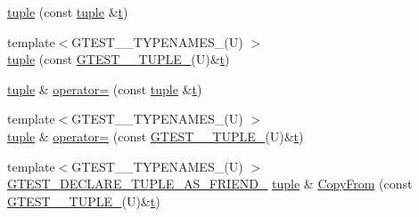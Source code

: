 \begin{DoxyCompactItemize}
\item 
\mbox{\hyperlink{classstd_1_1tr1_1_1tuple_ade1807f6e6b36daa6387c3b00dbd3be6}{tuple}} (const \mbox{\hyperlink{classstd_1_1tr1_1_1tuple}{tuple}} \&\mbox{\hyperlink{_mutual_8h_a978d88b393c8a37dc2614c88788b3442}{t}})
\item 
{\footnotesize template$<$G\+T\+E\+S\+T\+\_\+\_\+\+T\+Y\+P\+E\+N\+A\+M\+E\+S\+\_\+(\+U) $>$ }\\\mbox{\hyperlink{classstd_1_1tr1_1_1tuple_a7ff289d5c5a605e4a4f8fb56913f7370}{tuple}} (const \mbox{\hyperlink{namespacestd_1_1tr1_aa636d3269bf1f368a7bc09ff158bc482}{G\+T\+E\+S\+T\+\_\+\_\+\+T\+U\+P\+L\+E\+\_\+}}(U)\&\mbox{\hyperlink{_mutual_8h_a978d88b393c8a37dc2614c88788b3442}{t}})
\item 
\mbox{\hyperlink{classstd_1_1tr1_1_1tuple}{tuple}} \& \mbox{\hyperlink{classstd_1_1tr1_1_1tuple_ae52bd211e87c30ea7243246fa06bf038}{operator=}} (const \mbox{\hyperlink{classstd_1_1tr1_1_1tuple}{tuple}} \&\mbox{\hyperlink{_mutual_8h_a978d88b393c8a37dc2614c88788b3442}{t}})
\item 
{\footnotesize template$<$G\+T\+E\+S\+T\+\_\+\_\+\+T\+Y\+P\+E\+N\+A\+M\+E\+S\+\_\+(\+U) $>$ }\\\mbox{\hyperlink{classstd_1_1tr1_1_1tuple}{tuple}} \& \mbox{\hyperlink{classstd_1_1tr1_1_1tuple_a9ed59ab84e2ff750d0a188c3d9dac819}{operator=}} (const \mbox{\hyperlink{namespacestd_1_1tr1_aa636d3269bf1f368a7bc09ff158bc482}{G\+T\+E\+S\+T\+\_\+\_\+\+T\+U\+P\+L\+E\+\_\+}}(U)\&\mbox{\hyperlink{_mutual_8h_a978d88b393c8a37dc2614c88788b3442}{t}})
\item 
{\footnotesize template$<$G\+T\+E\+S\+T\+\_\+\_\+\+T\+Y\+P\+E\+N\+A\+M\+E\+S\+\_\+(\+U) $>$ }\\\mbox{\hyperlink{gtest-tuple_8h_a2b20671273f514a88a6e9b8328e5f257}{G\+T\+E\+S\+T\+\_\+\+D\+E\+C\+L\+A\+R\+E\+\_\+\+T\+U\+P\+L\+E\+\_\+\+A\+S\+\_\+\+F\+R\+I\+E\+N\+D\+\_\+}} \mbox{\hyperlink{classstd_1_1tr1_1_1tuple}{tuple}} \& \mbox{\hyperlink{classstd_1_1tr1_1_1tuple_a3d06fb121d18b6e1c10d14f9e966618d}{Copy\+From}} (const \mbox{\hyperlink{namespacestd_1_1tr1_aa636d3269bf1f368a7bc09ff158bc482}{G\+T\+E\+S\+T\+\_\+\_\+\+T\+U\+P\+L\+E\+\_\+}}(U)\&\mbox{\hyperlink{_mutual_8h_a978d88b393c8a37dc2614c88788b3442}{t}})
\end{DoxyCompactItemize}
